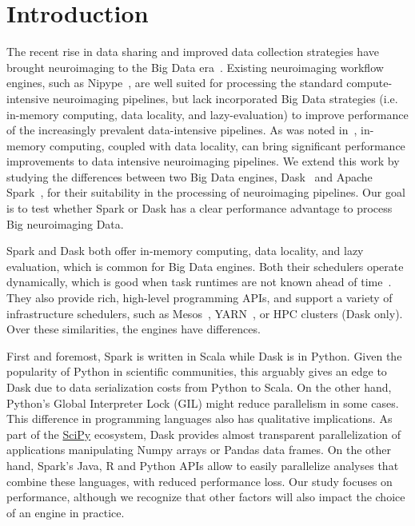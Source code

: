 \documentclass[conference]{IEEEtran}
\begin{document}
\section{Introduction}
The recent rise in data sharing and improved data collection strategies
have brought neuroimaging to the Big Data era~\cite{ALFAROALMAGRO:18,
van2014human}. Existing neuroimaging workflow engines, such as
Nipype~\cite{Nipype:11}, are well suited for processing the standard
compute-intensive neuroimaging pipelines, but lack incorporated Big Data
strategies (i.e. in-memory computing, data locality, and lazy-evaluation) to
improve performance of the increasingly prevalent data-intensive pipelines.
As was noted in~\cite{hayot2019performance}, in-memory computing, coupled
with data locality, can bring significant performance improvements to data
intensive neuroimaging pipelines. We extend this work by studying the
differences between two Big Data engines, Dask~\cite{Dask:15} and Apache
Spark~\cite{Spark:16}, for their suitability in the processing of neuroimaging
pipelines. Our goal is to test whether Spark or Dask has a clear
performance advantage to process Big neuroimaging Data. 

Spark and Dask both offer in-memory computing, data locality, and lazy evaluation,
which is common for Big Data engines. Both their schedulers operate dynamically,
which is good when task runtimes are not known ahead of time~\cite{Dask:15}. They
also provide rich, high-level programming APIs, and support a variety of
infrastructure schedulers, such as Mesos~\cite{hindman2011mesos}, YARN~\cite{vavilapalli2013apache}, or HPC clusters (Dask only). Over
these similarities, the engines have differences.

First and foremost, Spark is written in Scala while Dask is in Python.
Given the popularity of Python in scientific communities, this arguably
gives an edge to Dask due to data serialization costs from Python to Scala.
On the other hand, Python's Global Interpreter Lock (GIL) might reduce
parallelism in some cases. This difference in programming languages also
has qualitative implications. As part of the \href{http://scipy.org}{SciPy}
ecosystem, Dask provides almost transparent parallelization of applications
manipulating Numpy arrays or Pandas data frames. On the other hand, Spark's
Java, R and Python APIs allow to easily parallelize analyses that combine
these languages, with reduced performance loss. Our study focuses on
performance, although we recognize that other factors will also impact the
choice of an engine in practice.
\end{document}
